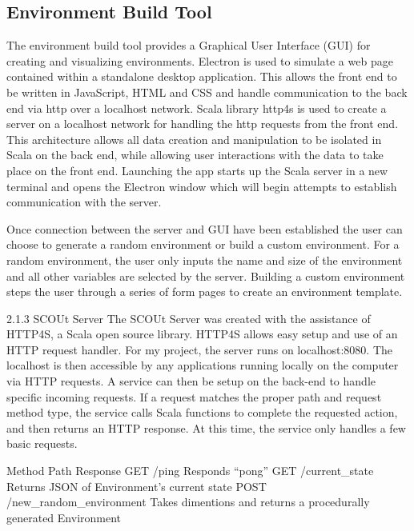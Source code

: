 \documentclass[]{report}
\begin{document}
\subsection{Environment Build Tool}
The environment build tool provides a Graphical User Interface (GUI) for creating and visualizing environments.
Electron  is used to simulate a web page contained within a standalone desktop application.
This allows the front end to be written in JavaScript, HTML and CSS and handle communication to the back end via http over a localhost network.
Scala library http4s  is used to create a server on a localhost network for handling the http requests from the front end.
This architecture allows all data creation and manipulation to be isolated in Scala on the back end, while allowing user interactions with the data to take place on the front end.
Launching the app starts up the Scala server in a new terminal and opens the Electron window which will begin attempts to establish communication with the server.

Once connection between the server and GUI have been established the user can choose to generate a random environment or build a custom environment. 
For a random environment, the user only inputs the name and size of the environment and all other variables are selected by the server.
Building a custom environment steps the user through a series of form pages to create an environment template.

2.1.3 SCOUt Server
The SCOUt Server was created with the assistance of HTTP4S, a Scala open source library.
HTTP4S allows easy setup and use of an HTTP request handler. For my project, the server runs on localhost:8080.
The localhost is then accessible by any applications running locally on the computer via HTTP requests.
A service can then be setup on the back-end to handle specific incoming requests.
If a request matches the proper path and request method type, the service calls Scala functions to complete the requested action, and then returns an HTTP response.
At this time, the service only handles a few basic requests.

Method	Path	Response
GET	/ping	Responds “pong”
GET	/current_state	Returns JSON of Environment’s current state
POST	/new_random_environment	Takes dimentions and returns a procedurally generated Environment
\end{document}
